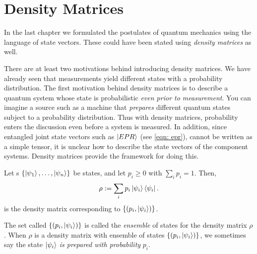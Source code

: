 
\chapter{Density Matrices} %

\label{Chapter4-density matrix} %


In the last chapter we formulated the postulates of quantum mechanics using the language of state vectors. These could have been stated using \textit{density matrices} as well. 

There are at least two motivations behind introducing density matrices. We have already seen that measurements yield different states with a probability distribution. The first motivation behind density matrices is to describe a quantum system whose state is probabilistic {\emph{even prior to measurement}}. You can imagine a source such as a machine that \emph{prepares} different quantum states subject to a probability distribution. Thus with density matrices, probability enters the discussion even before a system is measured.
In addition, since entangled joint state vectors such as $\ket{EPR}$ (see \eqref{eqn: epr}), cannot be written as a simple tensor, it is unclear how to describe the state vectors of the component systems.  Density matrices provide the framework for doing this. 




\begin{definition}
Let s $\{\ket{\psi_1},\hdots,\ket{\psi_n}\}$ be states, and let $p_i\geq 0$ with $\sum\limits_i p_i=1$.
Then, 
\begin{equation}
    \rho:=\sum_i p_i \ket{\psi_i}\bra{\psi_i}.
\end{equation}
is the density matrix corresponding to $\{(p_i, \ket{\psi_i})\}$. 
\end{definition}
The set called $\{(p_i, \ket{\psi_i})\}$ is called the \textit{ensemble} of states for the density matrix $\rho$.  When $\rho$ is a density matrix with ensemble of states $\{(p_i, \ket{\psi_i})\}$, we sometimes say the state $\ket{\psi_i}$ {\emph{is prepared with probability}} $p_i$.

